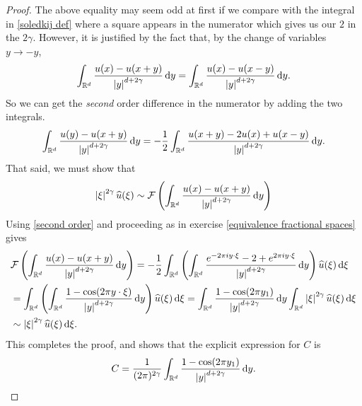 \documentclass[
    a4paper,
    DIV=14,
    abstract=true,
    numbers=noenddot
]
{scrartcl}
\theoremstyle{definition}
\newcommand{\wh}[1]{\widehat{#1}}
\renewcommand{\d}{\,\mathrm{d}}\newcommand{\dx}{\,\mathrm{d}x}
\newcommand{\R}{\mathbb{R}}
\newcommand{\Ff}{\mathcal{F}}
\begin{document}
\begin{proof}
    The above equality may seem odd at first if we compare with the integral in \ref{soledkij def} where a square appears in the numerator which gives us our $2$  in the $2 \gamma $. However, it is justified by the fact that, by the change of variables $y \to -y$,
    \begin{align*}
        \int_{\R^d}\frac{u(x)-u(x+y)}{\abs{y}^{d+2\gamma}}\d y=\int_{\R^d}\frac{u(x)-u(x-y)}{\abs{y}^{d+2\gamma}}\d y.
    \end{align*}
    So we can get the \emph{second} order difference in the numerator by adding the two integrals.
    \begin{align}\label{second order}
        \int_{\R^d}\frac{u(y)-u(x+y)}{\abs{y}^{d+2\gamma}}\d y=-\frac{1}{2}\int_{\R^d}\frac{u(x+y)-2u(x)+u(x-y)}{\abs{y}^{d+2\gamma}}\d y.
    \end{align}
    That said, we must show that
    \begin{align*}
        \abs{\xi}^{2\gamma }\wh{u}(\xi )\sim \Ff \left(\int_{\R^d}\frac{u(x)-u(x+y)}{\abs{y}^{d+2\gamma}}\d y\right)
    \end{align*}
    Using \eqref{second order} and proceeding as in exercise \ref{equivalence fractional spaces} gives
    \begin{align*}
         & \Ff \left(\int_{\R^d}\frac{u(x)-u(x+y)}{\abs{y}^{d+2\gamma}}\d y\right)= -\frac{1}{2} \int_{\R^d}\left(\int_{\R^d}\frac{e^{-2\pi i y \cdot \xi}-2+e^{2\pi i y \cdot \xi}}{\abs{y}^{d+2\gamma}}\d y\right) \wh{u}(\xi)\d \xi       \\
         & =\int_{\R^d}\left(\int_{\R^d}\frac{1-\cos(2\pi y \cdot \xi)}{\abs{y}^{d+2\gamma}}\d y\right) \wh{u}(\xi)\d \xi =\int_{\R^d}  \frac{1-\cos(2\pi  y_1) }{\abs{y}^{d+2\gamma	}}\d y\int_{\R^d}\abs{\xi}^{2 \gamma }\wh{u}(\xi)\d \xi \\& \sim \abs{\xi}^{2 \gamma }\wh{u}(\xi)\d \xi.
    \end{align*}
    This completes the proof, and shows that the explicit expression for $C$ is
    \begin{align*}
        C=\frac{1}{(2\pi)^{2 \gamma }}\int_{\R^d}  \frac{1-\cos(2\pi  y_1) }{\abs{y}^{d+2\gamma	}}\d y.
    \end{align*}
\end{proof}
\end{document}
